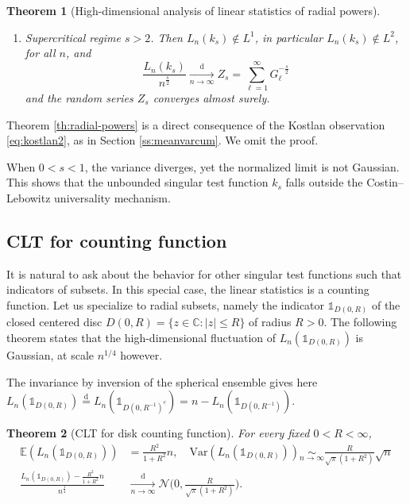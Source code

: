 \documentclass[10pt,reqno]{amsart}
\numberwithin{equation}{section}
\numberwithin{figure}{section}
\theoremstyle{plain}
\newtheorem{theorem}{Theorem}[section]
\newcommand{\<}{\langle}
\renewcommand{\>}{\rangle}
\begin{document}
\begin{theorem}[High-dimensional analysis of linear statistics of radial
  powers]
\begin{enumerate}[label=\textup{(\roman*)}]
    in particular $L_n(k_2)\not\in L^2$, for all $n$, and
      \[
        \frac{L_n(k_2)}{n}-\left(H_{n-1}-1\right)
        \xrightarrow[n\to\infty]{\mathrm d}
        Y_2=
        G_1^{-1}
        +
        \sum_{\ell=2}^{\infty}
        \left(
          G_\ell^{-1}-\frac1{\ell-1}
        \right).
      \]
      Equivalently, $\frac{L_n(k_2)}{n}-\log n \xrightarrow[n\to\infty]{\mathrm d} Y_2+\gamma-1$
        where $\gamma$ is the Euler constant,
      \item \emph{Supercritical regime $s>2$.} Then
        $L_n(k_s)\not\in L^1$, in particular 
    $L_n(k_s)\not\in L^2$, for all $n$, and
    \[
      \frac{L_n(k_s)}{n^{\frac{s}{2}}}
      \xrightarrow[n\to\infty]{\mathrm d}
      Z_s  = \sum_{\ell=1}^{\infty}G_\ell^{-\frac{s}{2}}
    \]
    and the random series $Z_s$ converges almost surely.     
\end{enumerate}
\end{theorem}

Theorem \ref{th:radial-powers} is a direct consequence of the Kostlan observation \eqref{eq:kostlan2}, as in Section \ref{ss:meanvarcum}. We omit the proof.

When $0<s<1$, the variance diverges, yet the normalized limit is not Gaussian. This shows that the unbounded singular test function $k_s$ falls outside the Costin--Lebowitz universality mechanism.

\subsection{CLT for counting function} It is natural to ask about the behavior for other singular test functions such that indicators of subsets. In this special case, the linear statistics is a counting function. Let us specialize to radial subsets, namely the indicator $\mathbb{1}_{D(0,R)}$ of the closed centered disc $D(0,R)=\{z\in\mathbb{C}:|z|\leq R\}$ of radius $R>0$. The following theorem states that the high-dimensional fluctuation of $L_n(\mathbb{1}_{D(0,R)})$ is Gaussian, at scale $n^{1/4}$ however.

The invariance by inversion of the spherical ensemble gives here
$L_n(\mathbb{1}_{D(0,R)})\overset{\mathrm{d}}{=}L_n(\mathbb{1}_{D(0,R^{-1})^c})=n-L_n(\mathbb{1}_{D(0,R^{-1})})$.

\begin{theorem}[CLT for disk counting function]\label{th:count}
For every fixed $0<R<\infty$,
\begin{align*}
\mathbb{E}(L_n(\mathbb{1}_{D(0,R)}))
&=\frac{R^2}{1+R^2}n,\quad
\mathrm{Var}(L_n(\mathbb{1}_{D(0,R)}))
\underset{n\to\infty}{\sim}
\frac{R}{\sqrt{\pi}(1+R^2)}\sqrt{n}\\
\frac{L_n(\mathbb{1}_{D(0,R)})-\frac{R^2}{1+R^2}n}
{n^{\frac{1}{4}}}
&\xrightarrow[n\to\infty]{\mathrm{d}}
\mathcal{N}\Bigr(0,\frac{R}{\sqrt{\pi}(1+R^2)}\Bigr).
\end{align*}
\end{theorem}
\end{document}
